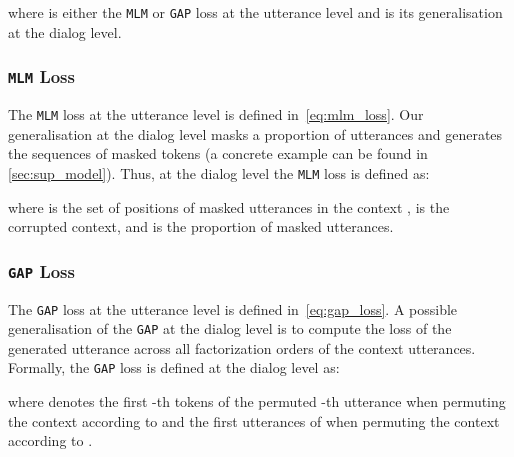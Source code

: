 \documentclass[11pt,a4paper]{article}
\begin{document}
where  is either the \texttt{MLM} or \texttt{GAP} loss at the utterance level and  is its generalisation at the dialog level.



\subsubsection{\texttt{MLM} Loss}
The \texttt{MLM} loss at the utterance level is defined in~\autoref{eq:mlm_loss}. Our generalisation at the dialog level masks a proportion  of utterances and generates the sequences of masked tokens (a concrete example can be found in \autoref{sec:sup_model}).  
Thus, at the dialog level the \texttt{MLM} loss is defined as: 
 
where    is the set of positions of masked utterances in the context ,  is the corrupted context, and  is the proportion of masked utterances.  

\subsubsection{\texttt{GAP} Loss} 
The \texttt{GAP} loss at the utterance level is defined in~\autoref{eq:gap_loss}. A possible generalisation of the \texttt{GAP} at the dialog level is to compute the loss of the generated utterance across all factorization orders of the context utterances. Formally, the \texttt{GAP} loss is defined at the dialog level as: 

where   denotes the first -th tokens of the permuted -th utterance when permuting the context according to   and  the first  utterances of  when permuting the context according to .
\end{document}
